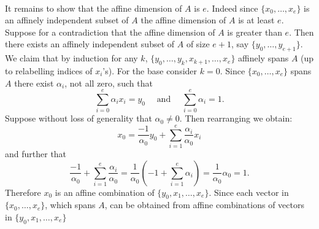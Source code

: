 \documentclass[letterpaper,12pt,oneside,onecolumn]{article}
\begin{document}
\paragraph{}
It remains to show that the affine dimension of $A$ is $e$. Indeed since $\{x_0, \dots, x_e\}$ is an affinely independent subset of $A$ the affine dimension of $A$ is at least $e$. Suppose for a contradiction that the affine dimension of $A$ is greater than $e$. Then there exists an affinely independent subset of $A$ of size $e+1$, say $\{y_0, \dots, y_{e+1}\}$. We claim that by induction for any $k$, $\{y_0, \dots, y_k, x_{k+1}, \dots, x_e\}$ affinely spans $A$ (up to relabelling indices of $x_i$'s). For the base consider $k=0$. Since $\{x_0, \dots, x_e\}$ spans $A$ there exist $\alpha_i$, not all zero, such that $$\sum_{i=0}^e \alpha_i x_i = y_0 \quad\text{ and }\quad \sum_{i=0}^e \alpha_i = 1.$$
Suppose without loss of generality that $\alpha_0 \neq 0$. Then rearranging we obtain:
$$x_0 = \frac{-1}{\alpha_0}y_0 + \sum_{i=1}^e \frac{\alpha_i}{\alpha_0} x_i$$
and further that
$$\frac{-1}{\alpha_0} + \sum_{i=1}^e \frac{\alpha_i}{\alpha_0} = \frac{1}{\alpha_0}(-1+\sum_{i=1}^e \alpha_i) = \frac{1}{\alpha_0}\alpha_0 = 1.$$
Therefore $x_0$ is an affine combination of $\{y_0, x_1, \dots, x_e\}$. Since each vector in $\{x_0, \dots, x_e\}$, which spans $A$, can be obtained from affine combinations of vectors in $\{y_0, x_1, \dots, x_e\}$ 
\end{document}
